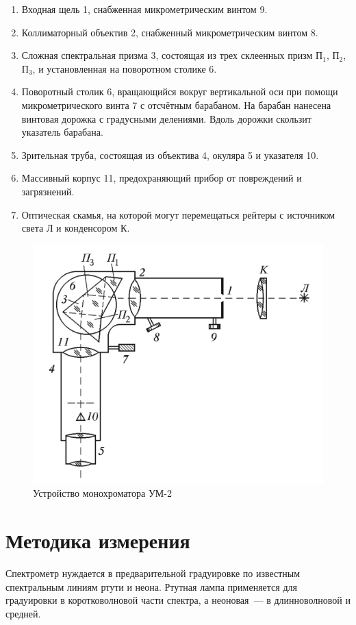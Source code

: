 \documentclass[reprint, nofootinbib, 10pt]{revtex4-2}
\begin{document}
\begin{enumerate}
	\item Входная щель 1, снабженная микрометрическим винтом 9.
	\item Коллиматорный объектив 2, снабженный микрометрическим винтом 8.
	\item Сложная спектральная призма 3, состоящая из трех склеенных призм П$_1$, П$_2$, П$_3$,
		и установленная на поворотном столике 6.
	\item Поворотный столик 6, вращающийся вокруг вертикальной оси при помощи микрометрического
		винта 7 с отсчётным барабаном. На барабан нанесена винтовая дорожка с градусными делениями.
		Вдоль дорожки скользит указатель барабана.
	\item Зрительная труба, состоящая из объектива 4, окуляра 5 и указателя 10.
	\item Массивный корпус 11, предохраняющий прибор от повреждений и загрязнений.
	\item Оптическая скамья, на которой могут перемещаться рейтеры с источником света Л и
		конденсором К.
\end{enumerate}

\begin{figure}[ht]
	\includegraphics[width=0.7\linewidth]{spectrometr.png}
	\caption{Устройство монохроматора УМ-2}
	\label{fig:spectrometer}
\end{figure}

\section*{Методика измерения}

Спектрометр нуждается в предварительной градуировке по известным спектральным линиям ртути и
неона. Ртутная лампа применяется для градуировки в коротковолновой части спектра,
а неоновая~--- в длинноволновой и средней.
\end{document}
